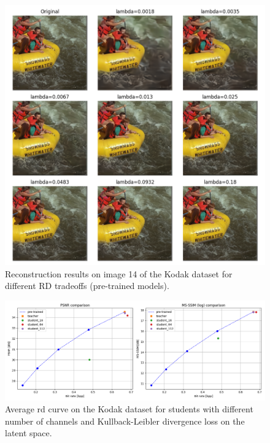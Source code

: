 \documentclass{article}
\begin{document}
\begin{figure}
  \centering
  \includegraphics[width=15cm]{bdpsnr_kodak_14_pretrained.png}
  \caption[Reconstruction results on image 14 of the Kodak dataset for different RD tradeoffs (pre-trained models).]{Reconstruction results on image 14 of the Kodak dataset for different RD tradeoffs (pre-trained models).}
  \label{appendix:pretrained}
\end{figure}

\begin{figure}
  \centering
  \includegraphics[width=15cm]{kd_lic_rd_channels_kld.png}
  \caption[Average \acrshort{rd} curve on the Kodak dataset for students with different number of channels and Kullback-Leibler divergence loss on the latent space.]{Average \acrshort{rd} curve on the Kodak dataset for students with different number of channels and Kullback-Leibler divergence loss on the latent space.}
  \label{appendix:kd_lic_1_kld}
\end{figure}
\end{document}
